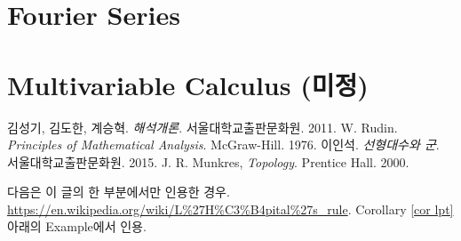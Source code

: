 \documentclass[12pt]{article}
\theoremstyle{definition}
\begin{document}
\section{Fourier Series}

\section{Multivariable Calculus (미정)}


\begin{thebibliography}{99}
	
	\label{ref1} 김성기, 김도한, 계승혁. \emph{해석개론}. 서울대학교출판문화원. 2011.
	\label{ref2} W. Rudin. \emph{Principles of Mathematical Analysis}. McGraw-Hill. 1976.
	 이인석. \emph{선형대수와 군}. 서울대학교출판문화원. 2015.
	 J. R. Munkres, \emph{Topology}. Prentice Hall. 2000.
	
	다음은 이 글의 한 부분에서만 인용한 경우.
	 \url{https://en.wikipedia.org/wiki/L%27H%C3%B4pital%27s_rule}. Corollary \ref{cor lpt} 아래의 Example에서 인용.
		
\end{thebibliography}
\end{document}
